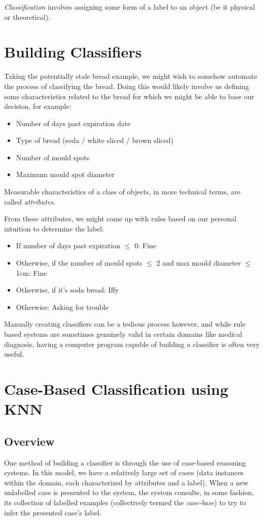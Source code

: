 \documentclass[a4paper,11pt]{report}
\begin{document}
\emph{Classification} involves assigning some form of a label to an object (be it physical or theoretical).

\section{Building Classifiers}
Taking the potentially stale bread example, we might wish to somehow automate the process of classifying the bread. Doing this would likely involve us defining some characteristics related to the bread for which we might be able to base our decision, for example:

\begin{itemize}
	\item Number of days past expiration date
	\item Type of bread (soda / white sliced / brown sliced)
	\item Number of mould spots
	\item Maximum mould spot diameter
\end{itemize}

 Measurable characteristics of a class of objects, in more technical terms, are called \emph{attributes}.
 
 From these attributes, we might come up with rules based on our personal intuition to determine the label:
 
 \begin{itemize}
 	\item If number of days past expiration $\le$ 0: Fine
 	\item Otherwise, if the number of mould spots $\le$ 2 and max mould diameter $\le$ 1cm: Fine
 	\item Otherwise, if it's soda bread: Iffy
 	\item Otherwise: Asking for trouble
 \end{itemize}
 
Manually creating classifiers can be a tedious process however, and while rule based systems are sometimes genuinely valid in certain domains like medical diagnosis, having a computer program capable of building a classifier is often very useful. 

\section{Case-Based Classification using KNN}
\subsection{Overview}
One method of building a classifier is through the use of case-based reasoning systems. In this model, we have a relatively large set of cases (data instances within the domain, each characterized by attributes and a label). When a new unlabelled case is presented to the system, the system consults, in some fashion, its collection of labelled examples (collectively termed the \emph{case-base}) to try to infer the presented case's label.
\end{document}
